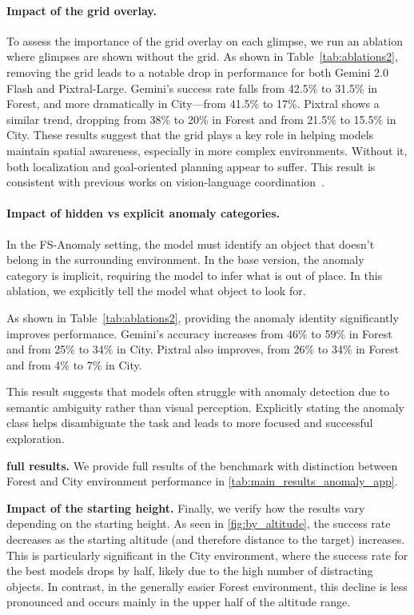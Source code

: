 \paragraph{Impact of the grid overlay.}
To assess the importance of the grid overlay on each glimpse, we run an ablation where glimpses are shown without the grid.
As shown in Table~\ref{tab:ablations2}, removing the grid leads to a notable drop in performance for both Gemini 2.0 Flash and Pixtral-Large. Gemini’s success rate falls from 42.5\% to 31.5\% in Forest, and more dramatically in City—from 41.5\% to 17\%. Pixtral shows a similar trend, dropping from 38\% to 20\% in Forest and from 21.5\% to 15.5\% in City.
These results suggest that the grid plays a key role in helping models maintain spatial awareness, especially in more complex environments. Without it, both localization and goal-oriented planning appear to suffer. This result is consistent with previous works on vision-language coordination~\cite{lei2024scaffolding}.

\paragraph{Impact of hidden vs explicit anomaly categories.}
In the FS-Anomaly setting, the model must identify an object that doesn’t belong in the surrounding environment. In the base version, the anomaly category is implicit, requiring the model to infer what is out of place. In this ablation, we explicitly tell the model what object to look for.

As shown in Table~\ref{tab:ablations2}, providing the anomaly identity significantly improves performance. Gemini's accuracy increases from 46\% to 59\% in Forest and from 25\% to 34\% in City. Pixtral also improves, from 26\% to 34\% in Forest and from 4\% to 7\% in City.

This result suggests that models often struggle with anomaly detection due to semantic ambiguity rather than visual perception. Explicitly stating the anomaly class helps disambiguate the task and leads to more focused and successful exploration.

\textbf{\anomalychallenge{} full results.}
We provide full results of the \anomalychallenge{} benchmark with distinction between Forest and City environment performance in \cref{tab:main_results_anomaly_app}.

\textbf{Impact of the starting height.}
Finally, we verify how the results vary depending on the starting height.
As seen in \cref{fig:by_altitude}, the success rate decreases as the starting altitude (and therefore distance to the target) increases. This is particularly significant in the City environment, where the success rate for the best models drops by half, likely due to the high number of distracting objects. In contrast, in the generally easier Forest environment, this decline is less pronounced and occurs mainly in the upper half of the altitude range.

